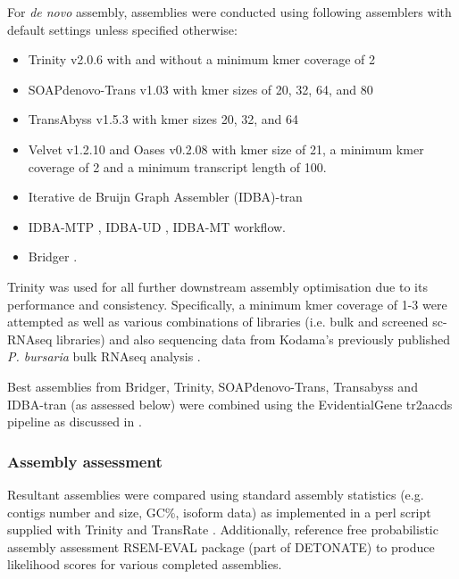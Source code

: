For \textit{de novo} assembly, assemblies were conducted using following 
assemblers with default settings unless specified otherwise:
\begin{itemize}
    \item Trinity v2.0.6 \citep{Grabherr2011} with and without a minimum kmer coverage of 2
    \item SOAPdenovo-Trans v1.03 \citep{Xie2014} with kmer sizes of 20, 32, 64, and 80   
    \item TransAbyss v1.5.3 \citep{Robertson2010} with kmer sizes 20, 32, and 64 
    \item Velvet v1.2.10 \citep{Zerbino2008} and Oases v0.2.08 \citep{Schulz2012} with kmer size of 
        21, a minimum kmer coverage of 2 and a minimum transcript length
        of 100.
    \item Iterative de Bruijn Graph Assembler (IDBA)-tran \citep{Peng2010,Peng2012,Peng2013} 
    \item IDBA-MTP \citep{Leung2014}, IDBA-UD \citep{Peng2012}, IDBA-MT \citep{Leung2013} workflow.
    \item Bridger \citep{Chang2015}.
\end{itemize}

Trinity was used for all further downstream assembly optimisation due to its performance
and consistency.
Specifically, a minimum kmer coverage of 1-3 were attempted as well as various
combinations of libraries (i.e. bulk and screened sc-RNAseq libraries) and also
sequencing data from Kodama's previously published \textit{P. bursaria} bulk
RNAseq analysis \citep{Kodama2014c}.

Best assemblies from Bridger, Trinity, SOAPdenovo-Trans, Transabyss and IDBA-tran 
(as assessed below) were combined using the EvidentialGene tr2aacds pipeline \citep{Gilbert2013}
as discussed in \citep{Nakasugi2014}.

\subsubsection{Assembly assessment}

Resultant assemblies were compared using standard assembly statistics 
(e.g. contigs number and size, GC\%, isoform data) as implemented in a perl script supplied with 
Trinity \citep{Haas2013} and TransRate \citep{Smith-unna2015}. 
Additionally, reference free probabilistic assembly assessment RSEM-EVAL package (part of DETONATE) \citep{Li2014} to
produce likelihood scores for various completed assemblies.

